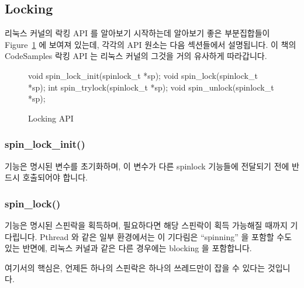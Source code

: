 \subsection{Locking}
\label{sec:toolsoftrade:Locking}

리눅스 커널의 락킹 API 를 알아보기 시작하는데 알아보기 좋은 부분집합들이
Figure~\ref{fig:toolsoftrade:Locking API} 에 보여져 있는데, 각각의 API 원소는
다음 섹션들에서 설명됩니다.
이 책의 CodeSamples 락킹 API 는 리눅스 커널의 그것을 거의 유사하게 따라갑니다.

\begin{figure}[tbp]
{ \scriptsize
\begin{verbbox}
void spin_lock_init(spinlock_t *sp);
void spin_lock(spinlock_t *sp);
int spin_trylock(spinlock_t *sp);
void spin_unlock(spinlock_t *sp);
\end{verbbox}
}
\centering
\theverbbox
\caption{Locking API}
\label{fig:toolsoftrade:Locking API}
\end{figure}

\subsubsection{spin\_lock\_init()}

 기능은 명시된  변수를 초기화하며, 이
변수가 다른 spinlock 기능들에 전달되기 전에 반드시 호출되어야 합니다.

\subsubsection{spin\_lock()}

 기능은 명시된 스핀락을 획득하며, 필요하다면 해당 스핀락이 획득
가능해질 때까지 기다립니다.
Pthread 와 같은 일부 환경에서는 이 기다림은 ``spinning'' 을 포함할 수도 있는
반면에, 리눅스 커널과 같은 다른 경우에는 blocking 을 포함합니다.

여기서의 핵심은, 언제든 하나의 스핀락은 하나의 쓰레드만이 잡을 수 있다는
것입니다.
\iffalse

